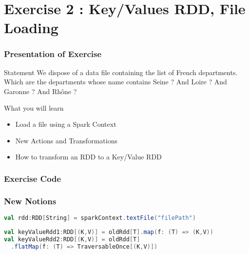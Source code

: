 \documentclass[slidetop,9pt,utf8]{beamer}
\begin{document}
\begin{CJK}{UTF8}{gbsn}
\begin{frame}[fragile]
\end{frame}

\section{Exercise 2 : Key/Values RDD, File Loading}

\begin{frame}
  \frametitle{Presentation of Exercise}

  \begin{block}{Statement}
    We dispose of a data file containing the list of French departments. Which are the departments whose name contains Seine ? And Loire ? And Garonne ? And Rhône ?
  \end{block}

  \begin{block}{What you will learn}
    \begin{itemize}
      \item Load a file using a Spark Context
      \item New Actions and Transformations
      \item How to transform an RDD to a Key/Value RDD
    \end{itemize}
  \end{block}

\end{frame}

\begin{frame}
  \frametitle{Exercise Code}

  

\end{frame}

\begin{frame}[fragile]
  \frametitle{New Notions}

  \begin{lstlisting}[label=LoadTextFile, caption=Load Text File, language=scala, style=code]
val rdd:RDD[String] = sparkContext.textFile("filePath")
  \end{lstlisting}

  \begin{lstlisting}[label=TransformToKeyValue, caption=Transform RDD to a Key/Value RDD, language=scala, style=code]
val keyValueRdd1:RDD[(K,V)] = oldRdd[T].map(f: (T) => (K,V))
val keyValueRdd2:RDD[(K,V)] = oldRdd[T]
  .flatMap(f: (T) => TraversableOnce[(K,V)])
  \end{lstlisting}


\end{frame}
\end{CJK}
\end{document}
